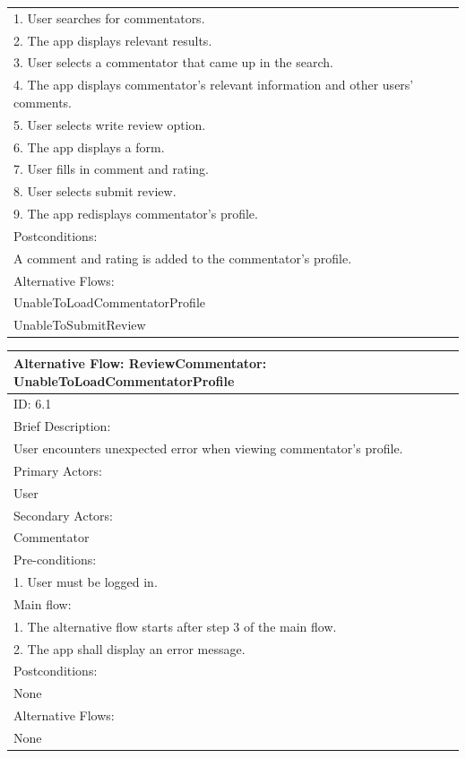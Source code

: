 \documentclass{article}
\begin{document}
\begin{flushleft}
\begin{longtable}[l]{|l|}
1. User searches for commentators.\\
2. The app displays relevant results.\\
3. User selects a commentator that came up in the search.\\
4. The app displays commentator’s relevant information and other users’ comments.\\
5. User selects write review option.\\
6. The app displays a form.\\
7. User fills in comment and rating.\\
8. User selects submit review.\\
9. The app redisplays commentator’s profile.\\
\hline
Postconditions:\\
A comment and rating is added to the commentator’s profile.\\
\hline
Alternative Flows:\\
UnableToLoadCommentatorProfile\\
UnableToSubmitReview\\
\hline
\end{longtable}
\begin{longtable}[l]{|l|}
\hline
Alternative Flow: ReviewCommentator: UnableToLoadCommentatorProfile\\
\hline
ID: 6.1\\
\hline
Brief Description: \\
User encounters unexpected error when viewing commentator’s profile.\\
\hline
Primary Actors:\\
User\\
\hline
Secondary Actors:\\
Commentator\\
\hline
Pre-conditions:\\
1. User must be logged in.\\
\hline
Main flow:\\
1. The alternative flow starts after step 3 of the main flow.\\
2. The app shall display an error message.\\
\hline
Postconditions:\\
None\\
\hline
Alternative Flows:\\
None\\
\hline
\end{longtable}
\begin{longtable}[l]{|l|}
\hline

\end{longtable}
\end{flushleft}
\end{document}

